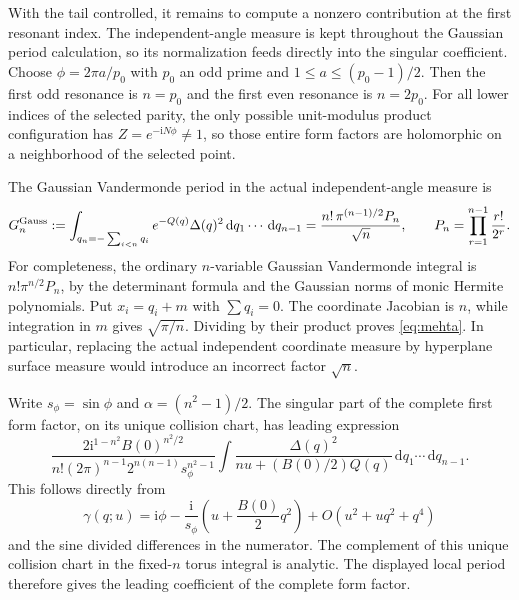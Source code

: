\documentclass[11pt]{article}
\numberwithin{equation}{section}
\theoremstyle{definition}
\newcommand{\dd}{\,\mathrm d}
\newcommand{\ii}{\mathrm i}
\begin{document}
With the tail controlled, it remains to compute a nonzero contribution
at the first resonant index. The independent-angle measure is kept
throughout the Gaussian period calculation, so its normalization feeds
directly into the singular coefficient.
Choose $\phi=2\pi a/p_0$ with $p_0$ an odd prime and
$1\le a\le(p_0-1)/2$. Then the first odd resonance is $n=p_0$ and
the first even resonance is $n=2p_0$. For all lower indices of the
selected parity, the only possible unit-modulus product configuration
has $Z=e^{-\ii N\phi}\ne1$, so those entire form factors are
holomorphic on a neighborhood of the selected point.

The Gaussian Vandermonde period in the actual independent-angle measure
is
\begin{equation}\label{eq:mehta}
 G_n^{\rm Gauss}:=
 \int_{q_n=-\sum_{i<n}q_i}e^{-Q(q)}\Delta(q)^2
                         \dd q_1\cdots\dd q_{n-1}
 =\frac{n!\,\pi^{(n-1)/2}P_n}{\sqrt n},\qquad
 P_n=\prod_{r=1}^{n-1}\frac{r!}{2^r}.
\end{equation}
For completeness, the ordinary $n$-variable Gaussian Vandermonde
integral is $n!\pi^{n/2}P_n$, by the determinant formula and the
Gaussian norms of monic Hermite polynomials. Put $x_i=q_i+m$ with
$\sum q_i=0$. The coordinate Jacobian is $n$, while integration in
$m$ gives $\sqrt{\pi/n}$. Dividing by their product proves
\eqref{eq:mehta}. In particular, replacing the actual independent
coordinate measure by hyperplane surface measure would introduce an
incorrect factor $\sqrt n$.

Write $s_\phi=\sin\phi$ and $\alpha=(n^2-1)/2$. The singular part
of the complete first form factor, on its unique collision chart, has
leading expression
\begin{equation}\label{eq:leadingintegral}
 \frac{2\ii^{1-n^2}B(0)^{n^2/2}}
 {n!(2\pi)^{n-1}2^{n(n-1)}s_\phi^{n^2-1}}
 \int\frac{\Delta(q)^2}{nu+(B(0)/2)Q(q)}
                                   \dd q_1\cdots\dd q_{n-1}.
\end{equation}
This follows directly from
\[
 \gamma(q;u)=\ii\phi-\frac{\ii}{s_\phi}
                  \left(u+\frac{B(0)}2q^2\right)
                  +O(u^2+u q^2+q^4)
\]
and the sine divided differences in the numerator. The complement of this unique collision chart in the fixed-$n$ torus
integral is analytic. The displayed local period therefore gives the
leading coefficient of the complete form factor.
\end{document}
